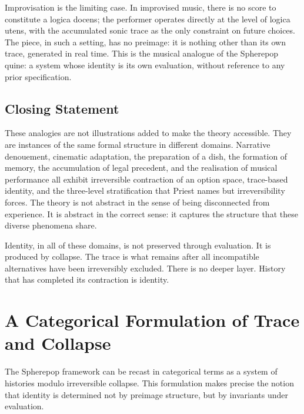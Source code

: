\documentclass[12pt, oneside]{amsbook}
\theoremstyle{plain}
\theoremstyle{definition}
\theoremstyle{remark}
\begin{document}
Improvisation is the limiting case. In improvised music, there is no score to
constitute a logica docens; the performer operates directly at the level of
logica utens, with the accumulated sonic trace as the only constraint on
future choices. The piece, in such a setting, has no preimage: it is nothing
other than its own trace, generated in real time. This is the musical analogue
of the Spherepop quine: a system whose identity is its own evaluation, without
reference to any prior specification.

\section{Closing Statement}

These analogies are not illustrations added to make the theory accessible.
They are instances of the same formal structure in different domains. Narrative
denouement, cinematic adaptation, the preparation of a dish, the formation of
memory, the accumulation of legal precedent, and the realisation of musical
performance all exhibit irreversible contraction of an option space, trace-based
identity, and the three-level stratification that Priest names but irreversibility
forces. The theory is not abstract in the sense of being disconnected from
experience. It is abstract in the correct sense: it captures the structure
that these diverse phenomena share.

Identity, in all of these domains, is not preserved through evaluation. It is
produced by collapse. The trace is what remains after all incompatible
alternatives have been irreversibly excluded. There is no deeper layer.
History that has completed its contraction is identity.


\appendix
\renewcommand{\chaptername}{Appendix}

\chapter{A Categorical Formulation of Trace and Collapse}
\label{app:categorical}

The Spherepop framework can be recast in categorical terms as a system of
histories modulo irreversible collapse. This formulation makes precise the
notion that identity is determined not by preimage structure, but by invariants
under evaluation.
\end{document}
